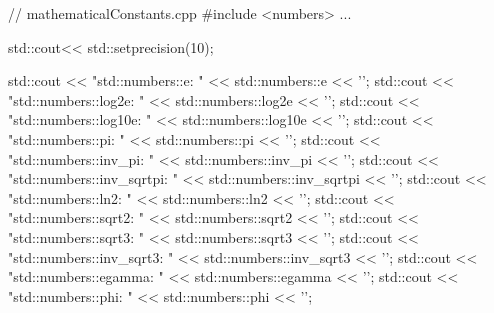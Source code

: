 \begin{cpp}
// mathematicalConstants.cpp
#include <numbers>
...

std::cout<< std::setprecision(10);

std::cout << "std::numbers::e: " << std::numbers::e << '\n';
std::cout << "std::numbers::log2e: " << std::numbers::log2e << '\n';
std::cout << "std::numbers::log10e: " << std::numbers::log10e << '\n';
std::cout << "std::numbers::pi: " << std::numbers::pi << '\n';
std::cout << "std::numbers::inv_pi: " << std::numbers::inv_pi << '\n';
std::cout << "std::numbers::inv_sqrtpi: " << std::numbers::inv_sqrtpi << '\n';
std::cout << "std::numbers::ln2: " << std::numbers::ln2 << '\n';
std::cout << "std::numbers::sqrt2: " << std::numbers::sqrt2 << '\n';
std::cout << "std::numbers::sqrt3: " << std::numbers::sqrt3 << '\n';
std::cout << "std::numbers::inv_sqrt3: " << std::numbers::inv_sqrt3 << '\n';
std::cout << "std::numbers::egamma: " << std::numbers::egamma << '\n';
std::cout << "std::numbers::phi: " << std::numbers::phi << '\n';
\end{cpp}






























